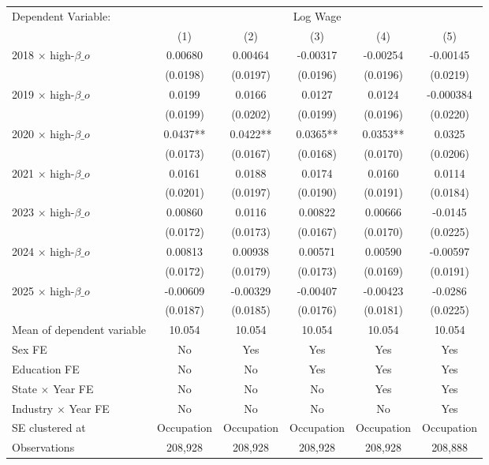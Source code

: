 \def\sym#1{\ifmmode^{#1}\else\(^{#1}\)\fi}
\begin{tabular}{l*{5}{c}}
\toprule
Dependent Variable: & \multicolumn{5}{c}{Log Wage} \\
\cmidrule(lr){2-6}
 & (1) & (2) & (3) & (4) & (5) \\
\midrule
2018 $\times$ high-$\beta\_o$&     0.00680   &     0.00464   &    -0.00317   &    -0.00254   &    -0.00145   \\
            &    (0.0198)   &    (0.0197)   &    (0.0196)   &    (0.0196)   &    (0.0219)   \\
2019 $\times$ high-$\beta\_o$&      0.0199   &      0.0166   &      0.0127   &      0.0124   &   -0.000384   \\
            &    (0.0199)   &    (0.0202)   &    (0.0199)   &    (0.0196)   &    (0.0220)   \\
2020 $\times$ high-$\beta\_o$&      0.0437** &      0.0422** &      0.0365** &      0.0353** &      0.0325   \\
            &    (0.0173)   &    (0.0167)   &    (0.0168)   &    (0.0170)   &    (0.0206)   \\
2021 $\times$ high-$\beta\_o$&      0.0161   &      0.0188   &      0.0174   &      0.0160   &      0.0114   \\
            &    (0.0201)   &    (0.0197)   &    (0.0190)   &    (0.0191)   &    (0.0184)   \\
2023 $\times$ high-$\beta\_o$&     0.00860   &      0.0116   &     0.00822   &     0.00666   &     -0.0145   \\
            &    (0.0172)   &    (0.0173)   &    (0.0167)   &    (0.0170)   &    (0.0225)   \\
2024 $\times$ high-$\beta\_o$&     0.00813   &     0.00938   &     0.00571   &     0.00590   &    -0.00597   \\
            &    (0.0172)   &    (0.0179)   &    (0.0173)   &    (0.0169)   &    (0.0191)   \\
2025 $\times$ high-$\beta\_o$&    -0.00609   &    -0.00329   &    -0.00407   &    -0.00423   &     -0.0286   \\
            &    (0.0187)   &    (0.0185)   &    (0.0176)   &    (0.0181)   &    (0.0225)   \\
\midrule
Mean of dependent variable&      10.054   &      10.054   &      10.054   &      10.054   &      10.054   \\
Sex FE      &          No   &         Yes   &         Yes   &         Yes   &         Yes   \\
Education FE&          No   &          No   &         Yes   &         Yes   &         Yes   \\
State $\times$ Year FE&          No   &          No   &          No   &         Yes   &         Yes   \\
Industry $\times$ Year FE&          No   &          No   &          No   &          No   &         Yes   \\
SE clustered at&  Occupation   &  Occupation   &  Occupation   &  Occupation   &  Occupation   \\
Observations&     208,928   &     208,928   &     208,928   &     208,928   &     208,888   \\
\bottomrule
\end{tabular}
